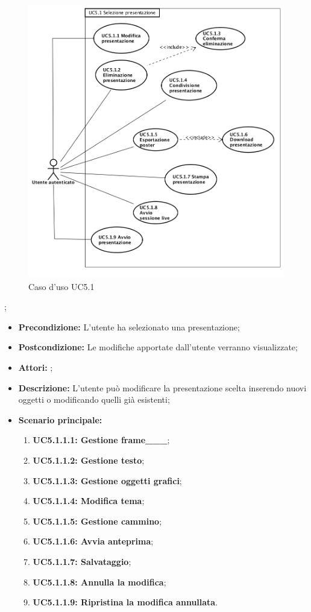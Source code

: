 \begin{figure}[h]
	\begin{center}
	\includegraphics[scale=0.4]{diagram/UC5-1.png}
	\caption{Caso d'uso UC5.1}
	\end{center}
\end{figure};
\begin{itemize}
	\item \textbf{Precondizione:} L'utente ha selezionato una presentazione;
	\item \textbf{Postcondizione:} Le modifiche apportate dall'utente verranno visualizzate;
	\item \textbf{Attori:} ;
	\item \textbf{Descrizione:} L'utente può modificare la presentazione scelta inserendo nuovi oggetti o modificando quelli già esistenti;
	\item \textbf{Scenario principale:}
	\begin{enumerate}
		\item \textbf{ UC5.1.1.1: Gestione frame___};
		\item \textbf{ UC5.1.1.2: Gestione testo};
		\item \textbf{ UC5.1.1.3: Gestione oggetti grafici};
		\item \textbf{ UC5.1.1.4: Modifica tema};
		\item \textbf{ UC5.1.1.5: Gestione cammino};
		\item \textbf{ UC5.1.1.6: Avvia anteprima};
		\item \textbf{ UC5.1.1.7: Salvataggio};
		\item \textbf{ UC5.1.1.8: Annulla la modifica};
		\item \textbf{ UC5.1.1.9: Ripristina la modifica annullata}.
	\end{enumerate}
\end{itemize}
